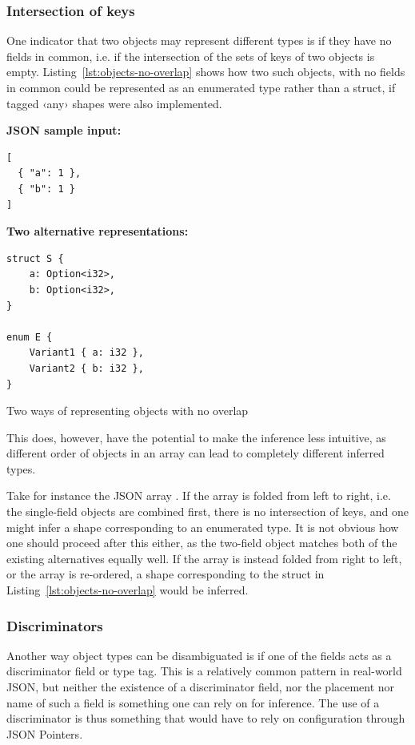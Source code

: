 \subsubsection{Intersection of keys}

One indicator that two objects may represent different types is if they have no fields in common, i.e. if the intersection of the sets of keys of two objects is empty. Listing~\ref{lst:objects-no-overlap} shows how two such objects, with no fields in common could be represented as an enumerated type rather than a struct, if tagged ‹any› shapes were also implemented.

\begin{listing}[ht!]
\textbf{JSON sample input:}
\begin{verbatim}
[
  { "a": 1 },
  { "b": 1 }
]
\end{verbatim}
\vspace{5mm}

\textbf{Two alternative representations:}
\begin{verbatim}
struct S {
    a: Option<i32>,
    b: Option<i32>,
}

enum E {
    Variant1 { a: i32 },
    Variant2 { b: i32 },
}
\end{verbatim}
\caption{Two ways of representing objects with no overlap}
\label{lst:objects-no-overlap}
\end{listing}

This does, however, have the potential to make the inference less intuitive, as different order of objects in an array can lead to completely different inferred types.

Take for instance the JSON array \icode{[\{ "a": 1 \}, \{ "b": 1 \}, \{ "a": 1, "b": 1 \}}. If the array is folded from left to right, i.e. the single-field objects are combined first, there is no intersection of keys, and one might infer a shape corresponding to an enumerated type. It is not obvious how one should proceed after this either, as the two-field object matches both of the existing alternatives equally well. If the array is instead folded from right to left, or the array is re-ordered, a shape corresponding to the struct in Listing~\ref{lst:objects-no-overlap} would be inferred.

\subsubsection{Discriminators}

Another way object types can be disambiguated is if one of the fields acts as a discriminator field or type tag. This is a relatively common pattern in real-world JSON, but neither the existence of a discriminator field, nor the placement nor name of such a field is something one can rely on for inference. The use of a discriminator is thus something that would have to rely on configuration through JSON Pointers.

